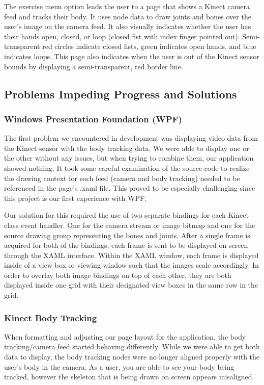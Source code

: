 \documentclass[onecolumn, draftclsnofoot,10pt, compsoc]{IEEEtran}
\begin{document}
The exercise menu option leads the user to a page that shows a Kinect camera feed and tracks their body. It uses node data to draw joints and bones over the user's image on the camera feed. It also visually indicates whether the user has their hands open, closed, or  loop (closed fist with index finger pointed out). Semi-transparent red circles indicate closed fists, green indicates open hands, and blue indicates loops. This page also indicates when the user is out of the Kinect sensor bounds by displaying a semi-transparent, red border line. 

\subsection{Problems Impeding Progress and Solutions}
\subsubsection{Windows Presentation Foundation (WPF)}
The first problem we encountered in development was displaying video data from the Kinect sensor with the body tracking data. We were able to display one or the other without any issues, but when trying to combine them, our application showed nothing. It took some careful examination of the source code to realize the drawing context for each feed (camera and body tracking) needed to be referenced in the page's .xaml file. This proved to be especially challenging since this project is our first experience with WPF.

Our solution for this required the use of two separate bindings for each Kinect class event handler. One for the camera stream or image bitmap and one for the source drawing group representing the bones and joints. After a single frame is acquired for both of the bindings, each frame is sent to be displayed on screen through the XAML interface. Within the XAML window, each frame is displayed inside of a view box or viewing window such that the images scale accordingly. In order to overlay both image bindings on top of each other, they are both displayed inside one grid with their designated view boxes in the same row in the grid.

\subsubsection{Kinect Body Tracking}
When formatting and adjusting our page layout for the application, the body tracking/camera feed started behaving differently. While we were able to get both data to display, the body tracking nodes were no longer aligned properly with the user's body in the camera. As a user, you are able to see your body being tracked, however the skeleton that is being drawn on screen appears misaligned. 
\end{document}

